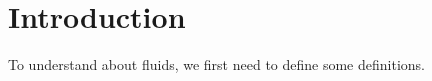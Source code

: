 \documentclass{article}
\begin{document}





\section{Introduction}
To understand about fluids, we first need to define some definitions.
\end{document}
